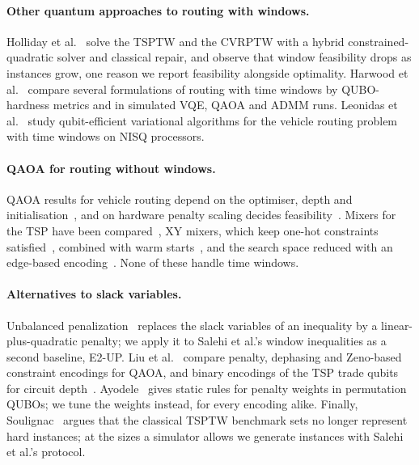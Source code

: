 \paragraph{Other quantum approaches to routing with windows.} Holliday et
al.~\cite{holliday2025advanced} solve the TSPTW and the CVRPTW with a hybrid
constrained-quadratic solver and classical repair, and observe that window feasibility drops as
instances grow, one reason we report feasibility alongside optimality. Harwood et
al.~\cite{harwood2021formulating} compare several formulations of routing with time windows by
QUBO-hardness metrics and in simulated VQE, QAOA and ADMM runs. Leonidas et
al.~\cite{leonidas2023qubit} study qubit-efficient variational algorithms for the vehicle
routing problem with time windows on NISQ processors.

\paragraph{QAOA for routing without windows.} QAOA results for vehicle routing depend on the
optimiser, depth and initialisation~\cite{azad2023solving}, and on hardware penalty scaling
decides feasibility~\cite{azfar2025quantum}. Mixers for the TSP have been
compared~\cite{qian2023comparative}, XY mixers, which keep one-hot constraints
satisfied~\cite{hadfield2019qaoa,wang2020xy}, combined with warm starts~\cite{docarmo2025warm},
and the search space reduced with an edge-based encoding~\cite{kallerimadhu2025edge}. None of
these handle time windows.

\paragraph{Alternatives to slack variables.} Unbalanced
penalization~\cite{montanezbarrera2024unbalanced} replaces the slack variables of an inequality
by a linear-plus-quadratic penalty; we apply it to Salehi et al.'s window inequalities as a
second baseline, E2-UP. Liu et al.~\cite{liu2024comparison} compare penalty, dephasing and
Zeno-based constraint encodings for QAOA, and binary encodings of the TSP trade qubits for
circuit depth~\cite{glos2022space}. Ayodele~\cite{ayodele2022penalty} gives static rules for
penalty weights in permutation QUBOs; we tune the weights instead, for every encoding alike.
Finally, Soulignac~\cite{soulignac2026beware} argues that the classical TSPTW benchmark sets no
longer represent hard instances; at the sizes a simulator allows we generate instances with
Salehi et al.'s protocol.

